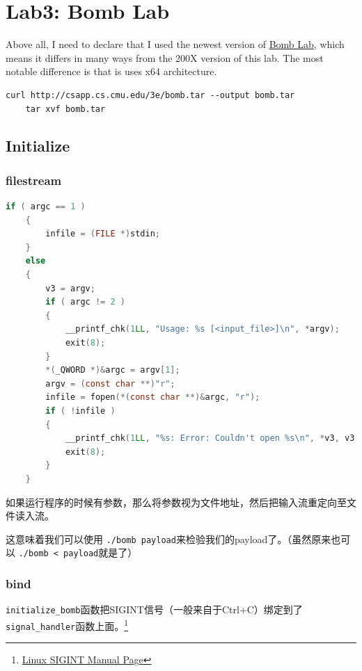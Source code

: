 \documentclass[a4pper,12pt,onecolumn]{article}
\begin{document}
\section{Lab3: Bomb Lab}

Above all, I need to declare that I used the newest version of \href{http://csapp.cs.cmu.edu/3e/bomblab.pdf}{Bomb Lab}, which means it differs in many ways from the 200X version of this lab. The most notable difference is that is uses x64 architecture.

\begin{lstlisting}[style=DOS]
    curl http://csapp.cs.cmu.edu/3e/bomb.tar --output bomb.tar
    tar xvf bomb.tar
\end{lstlisting}

\subsection{Initialize}

\subsubsection{filestream}

\begin{lstlisting}[language=c]
    if ( argc == 1 )
    {
        infile = (FILE *)stdin;
    }
    else
    {
        v3 = argv;
        if ( argc != 2 )
        {
            __printf_chk(1LL, "Usage: %s [<input_file>]\n", *argv);
            exit(8);
        }
        *(_QWORD *)&argc = argv[1];
        argv = (const char **)"r";
        infile = fopen(*(const char **)&argc, "r");
        if ( !infile )
        {
            __printf_chk(1LL, "%s: Error: Couldn't open %s\n", *v3, v3[1]);
            exit(8);
        }
    }
\end{lstlisting}

如果运行程序的时候有参数，那么将参数视为文件地址，然后把输入流重定向至文件读入流。

这意味着我们可以使用 \texttt{./bomb payload}来检验我们的payload了。（虽然原来也可以 \texttt{./bomb < payload}就是了）

\subsubsection{bind}

 \texttt{initialize\_bomb}函数把SIGINT信号（一般来自于Ctrl+C）绑定到了 \texttt{signal\_handler}函数上面。\footnote{\href{https://man7.org/linux/man-pages/man3/siginterrupt.3.html}{Linux SIGINT Manual Page}}
\end{document}
